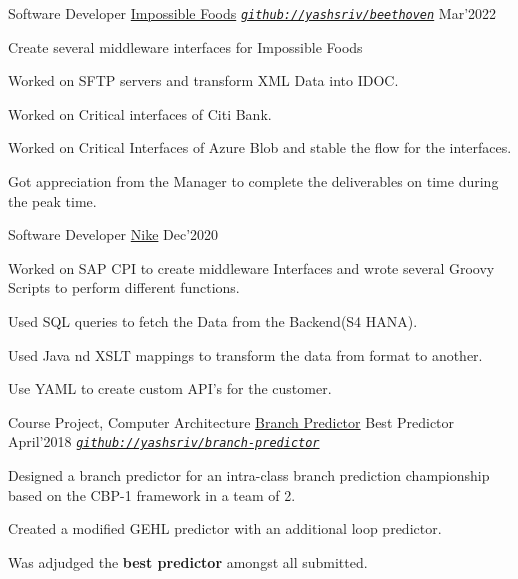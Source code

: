
\begin{cventries}

  \cventry
  
  {Software Developer}
  {\href{https://github.com/yashsriv/beethoven}{Impossible Foods}}
  {\emph{\texttt{\href{https://github.com/yashsriv/beethoven}{github://yashsriv/beethoven}}}}
  {Mar'2022}
  {
    \begin{cvitems}
    \item Create several middleware interfaces for Impossible Foods
    \item Worked on SFTP servers and transform XML Data into IDOC.
    \item Worked on Critical interfaces of Citi Bank.
    \item Worked on Critical Interfaces of Azure Blob and stable the flow for the interfaces.
    \item Got appreciation from the Manager to complete the deliverables on time during the peak time.
    \end{cvitems}
  }

  \cventry
  {Software Developer}
  {\href{https://github.com/yashsriv/networks-video-stream}{Nike}}
  {Dec'2020}
  {
    \begin{cvitems}
    \item Worked on SAP CPI to create middleware Interfaces and wrote several Groovy Scripts to perform different functions. 
    \item Used SQL queries to fetch the Data from the Backend(S4 HANA).
    \item Used Java nd XSLT mappings to transform the data from format to another.
    \item Use YAML to create custom API's for the customer.
    \end{cvitems}
  }

  \smallcventry
  {Course Project, Computer Architecture}
  {\href{https://github.com/yashsriv/branch-predictor/blob/master/report/main.pdf}{Branch Predictor}}
  {Best Predictor}
  {April'2018}
  {\emph{\texttt{\href{https://github.com/yashsriv/branch-predictor/blob/master/report/main.pdf}{github://yashsriv/branch-predictor}}}}
  {
    \begin{cvitems}
    \item Designed a branch predictor for an intra-class branch prediction
      championship based on the CBP-1 framework in a team of 2.
    \item Created a modified GEHL predictor with an additional loop predictor.
    \item Was adjudged the \textbf{best predictor} amongst all submitted.
    \end{cvitems}
  }


\end{cventries}
